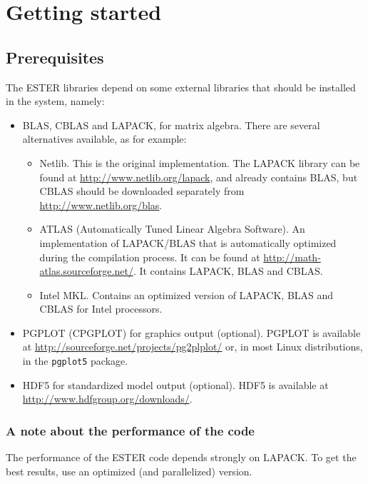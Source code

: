 \chapter{Getting started}
\section{Prerequisites}

The ESTER libraries depend on some external libraries that should be installed in
the system, namely:
\begin{itemize}
    \item BLAS, CBLAS and LAPACK, for matrix algebra. There are several
        alternatives available, as for example:
        \begin{itemize}
            \item Netlib. This is the original implementation. The LAPACK
                library can be found at \url{http://www.netlib.org/lapack}, and
                already contains BLAS, but CBLAS should be downloaded separately
                from \url{http://www.netlib.org/blas}.
            \item ATLAS (Automatically Tuned Linear Algebra Software). An
                implementation of LAPACK/BLAS that is automatically optimized
                during the compilation process. It can be found at
                \url{http://math-atlas.sourceforge.net/}. It contains LAPACK,
                BLAS and CBLAS.
            \item Intel MKL. Contains an optimized version of LAPACK, BLAS and
                CBLAS for Intel processors.
        \end{itemize}
    \item PGPLOT (CPGPLOT) for graphics output (optional). PGPLOT is available
        at \url{http://sourceforge.net/projects/pg2plplot/} or, in most Linux
        distributions, in the \texttt{pgplot5} package.
    \item HDF5 for standardized model output (optional). HDF5 is available at
        \url{http://www.hdfgroup.org/downloads/}.
\end{itemize}

\subsection{A note about the performance of the code}
The performance of the ESTER code depends strongly on LAPACK. To get the best results,
use an optimized (and parallelized) version.

